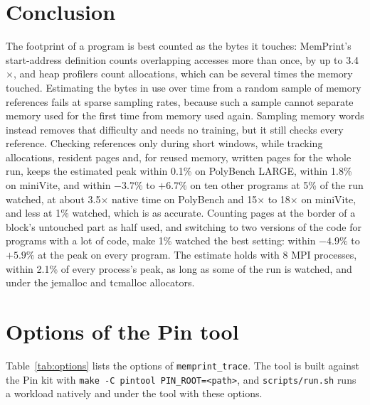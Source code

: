 \documentclass[11pt]{article}
\newcommand{\memprint}{MemPrint}
\newcommand{\tabref}[1]{Table~\ref{#1}}
\begin{document}
\section{Conclusion}
\label{sec:conclusion}

The footprint of a program is best counted as the bytes it touches: \memprint{}'s start-address definition counts overlapping accesses more than once, by up to 3.4$\times$, and heap profilers count allocations, which can be several times the memory touched. Estimating the bytes in use over time from a random sample of memory references fails at sparse sampling rates, because such a sample cannot separate memory used for the first time from memory used again. Sampling memory words instead removes that difficulty and needs no training, but it still checks every reference. Checking references only during short windows, while tracking allocations, resident pages and, for reused memory, written pages for the whole run, keeps the estimated peak within 0.1\% on PolyBench LARGE, within 1.8\% on miniVite, and within $-3.7\%$ to $+6.7\%$ on ten other programs at 5\% of the run watched, at about 3.5$\times$ native time on PolyBench and 15$\times$ to 18$\times$ on miniVite, and less at 1\% watched, which is as accurate. Counting pages at the border of a block's untouched part as half used, and switching to two versions of the code for programs with a lot of code, make 1\% watched the best setting: within $-4.9\%$ to $+5.9\%$ at the peak on every program. The estimate holds with 8 MPI processes, within 2.1\% of every process's peak, as long as some of the run is watched, and under the jemalloc and tcmalloc allocators.




\appendix

\section{Options of the Pin tool}
\label{app:options}

\tabref{tab:options} lists the options of \texttt{memprint\_trace}. The tool is built against the Pin kit with \texttt{make -C pintool PIN\_ROOT=<path>}, and \texttt{scripts/run.sh} runs a workload natively and under the tool with these options.
\end{document}
